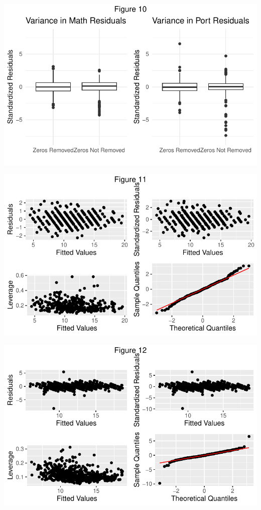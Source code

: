 \documentclass[
  letterpaper,
  DIV=11,
  numbers=noendperiod]{scrartcl}
\begin{document}
\includegraphics{Final_Paper_edit_files/figure-pdf/unnamed-chunk-10-1.pdf}

\includegraphics{Final_Paper_edit_files/figure-pdf/unnamed-chunk-11-1.pdf}

\includegraphics{Final_Paper_edit_files/figure-pdf/unnamed-chunk-11-2.pdf}
\end{document}

